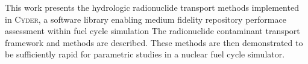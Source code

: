 
This work presents the hydrologic radionuclide transport methods implemented in 
\textsc{Cyder}, a software library enabling medium fidelity repository 
performace assessment within fuel cycle simulation The radionuclide contaminant 
transport framework and methods are described. These methods are then 
demonstrated to be sufficiently rapid for parametric studies in a nuclear fuel 
cycle simulator. 

